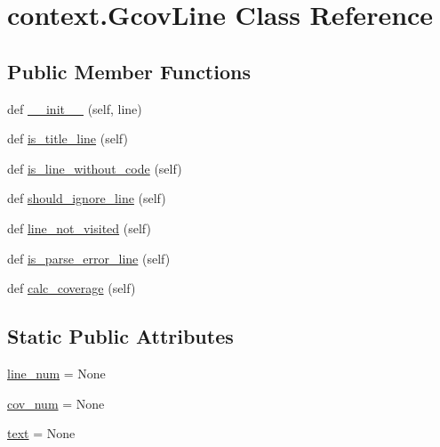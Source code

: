 \hypertarget{classcontext_1_1GcovLine}{}\section{context.\+Gcov\+Line Class Reference}
\label{classcontext_1_1GcovLine}
\subsection*{Public Member Functions}
\begin{DoxyCompactItemize}
\item 
def \mbox{\hyperlink{classcontext_1_1GcovLine_a055cc92ff557db5eaea188e2d022e24d}{\+\_\+\+\_\+init\+\_\+\+\_\+}} (self, line)
\item 
def \mbox{\hyperlink{classcontext_1_1GcovLine_a7fec30e26cfae938a433ea03afec2621}{is\+\_\+title\+\_\+line}} (self)
\item 
def \mbox{\hyperlink{classcontext_1_1GcovLine_aa6a99fe28aad4ef23fc2809b6a392d37}{is\+\_\+line\+\_\+without\+\_\+code}} (self)
\item 
def \mbox{\hyperlink{classcontext_1_1GcovLine_ab542525b64100361df144bac15447358}{should\+\_\+ignore\+\_\+line}} (self)
\item 
def \mbox{\hyperlink{classcontext_1_1GcovLine_a1abbe49346ec310a634375a54be8419b}{line\+\_\+not\+\_\+visited}} (self)
\item 
def \mbox{\hyperlink{classcontext_1_1GcovLine_a5d60341a9a609d77dde278135c9fb804}{is\+\_\+parse\+\_\+error\+\_\+line}} (self)
\item 
def \mbox{\hyperlink{classcontext_1_1GcovLine_af75d38292cba95dc97c72bcd788ddb5d}{calc\+\_\+coverage}} (self)
\end{DoxyCompactItemize}
\subsection*{Static Public Attributes}
\begin{DoxyCompactItemize}
\item 
\mbox{\hyperlink{classcontext_1_1GcovLine_af1cdc33968821862046e1b3168d4e300}{line\+\_\+num}} = None
\item 
\mbox{\hyperlink{classcontext_1_1GcovLine_af5a1b3b0e1ae0809f765657d1f93325c}{cov\+\_\+num}} = None
\item 
\mbox{\hyperlink{classcontext_1_1GcovLine_ad7a672e0f1662f04bf750626b3cc3d2f}{text}} = None
\end{DoxyCompactItemize}


